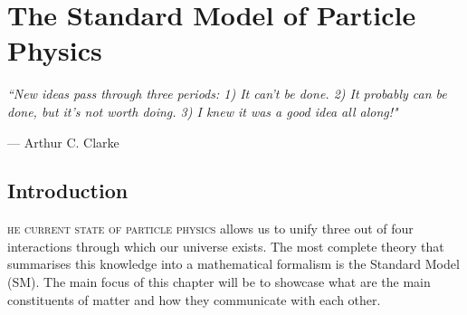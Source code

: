 \chapter{The Standard Model of Particle Physics}
\label{ch:theory}
\epigraph{\itshape``New ideas pass through three periods: 1) It can't be done. 2) It probably can be done, but it's not worth doing. 3) I knew it was a good idea all along!"}{--- \textup{Arthur C. Clarke}}
\mediumlinespacing
\section{Introduction}






\hspace{10pt}\lettrine[lines=2]{}{he current state of particle physics} allows us to unify three out of four interactions through which our universe exists. The most complete theory that summarises this knowledge into a mathematical formalism is the Standard Model (SM). The main focus of this chapter will be to showcase what are the main constituents of matter and how they communicate with each other.


